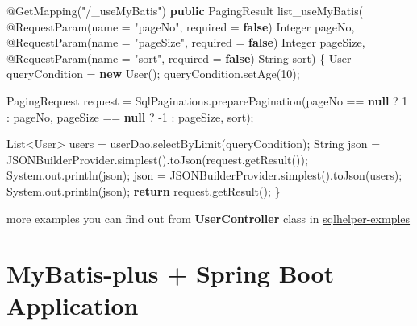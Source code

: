 \documentclass[
]{book}
\newenvironment{Shaded}{\begin{snugshade}}{\end{snugshade}}
\newcommand{\AttributeTok}[1]{\textcolor[rgb]{0.77,0.63,0.00}{#1}}
\newcommand{\BuiltInTok}[1]{#1}
\newcommand{\DecValTok}[1]{\textcolor[rgb]{0.00,0.00,0.81}{#1}}
\newcommand{\FunctionTok}[1]{\textcolor[rgb]{0.00,0.00,0.00}{#1}}
\newcommand{\KeywordTok}[1]{\textcolor[rgb]{0.13,0.29,0.53}{\textbf{#1}}}
\newcommand{\NormalTok}[1]{#1}
\newcommand{\StringTok}[1]{\textcolor[rgb]{0.31,0.60,0.02}{#1}}
\begin{document}
\begin{Shaded}
\begin{Highlighting}[]
    \AttributeTok{@GetMapping}\NormalTok{(}\StringTok{"/_useMyBatis"}\NormalTok{)}
    \KeywordTok{public}\NormalTok{ PagingResult }\FunctionTok{list_useMyBatis}\NormalTok{(}
            \AttributeTok{@RequestParam}\NormalTok{(name = }\StringTok{"pageNo"}\NormalTok{, required = }\KeywordTok{false}\NormalTok{) }\BuiltInTok{Integer}\NormalTok{ pageNo,}
            \AttributeTok{@RequestParam}\NormalTok{(name = }\StringTok{"pageSize"}\NormalTok{, required = }\KeywordTok{false}\NormalTok{) }\BuiltInTok{Integer}\NormalTok{ pageSize,}
            \AttributeTok{@RequestParam}\NormalTok{(name = }\StringTok{"sort"}\NormalTok{, required = }\KeywordTok{false}\NormalTok{) }\BuiltInTok{String}\NormalTok{ sort) \{}
\NormalTok{        User queryCondition = }\KeywordTok{new} \FunctionTok{User}\NormalTok{();}
\NormalTok{        queryCondition.}\FunctionTok{setAge}\NormalTok{(}\DecValTok{10}\NormalTok{);}

\NormalTok{        PagingRequest request = SqlPaginations.}\FunctionTok{preparePagination}\NormalTok{(pageNo == }\KeywordTok{null}\NormalTok{ ? }\DecValTok{1}\NormalTok{ : pageNo, pageSize == }\KeywordTok{null}\NormalTok{ ? -}\DecValTok{1}\NormalTok{ : pageSize, sort);}

        \BuiltInTok{List}\NormalTok{<User> users = userDao.}\FunctionTok{selectByLimit}\NormalTok{(queryCondition);}
        \BuiltInTok{String}\NormalTok{ json = JSONBuilderProvider.}\FunctionTok{simplest}\NormalTok{().}\FunctionTok{toJson}\NormalTok{(request.}\FunctionTok{getResult}\NormalTok{());}
        \BuiltInTok{System}\NormalTok{.}\FunctionTok{out}\NormalTok{.}\FunctionTok{println}\NormalTok{(json);}
\NormalTok{        json = JSONBuilderProvider.}\FunctionTok{simplest}\NormalTok{().}\FunctionTok{toJson}\NormalTok{(users);}
        \BuiltInTok{System}\NormalTok{.}\FunctionTok{out}\NormalTok{.}\FunctionTok{println}\NormalTok{(json);}
        \KeywordTok{return}\NormalTok{ request.}\FunctionTok{getResult}\NormalTok{();}
\NormalTok{    \}}
\end{Highlighting}
\end{Shaded}

more examples you can find out from \textbf{UserController} class in \href{https://github.com/fangjinuo/sqlhelper/blob/master/sqlhelper-examples/src/main/java/com/jn/sqlhelper/examples/common/controller/UserController.java}{sqlhelper-exmples}

\hypertarget{sqlhelper_mybatisplus_springboot}{%
\section{MyBatis-plus + Spring Boot Application}\label{sqlhelper_mybatisplus_springboot}}
\end{document}
